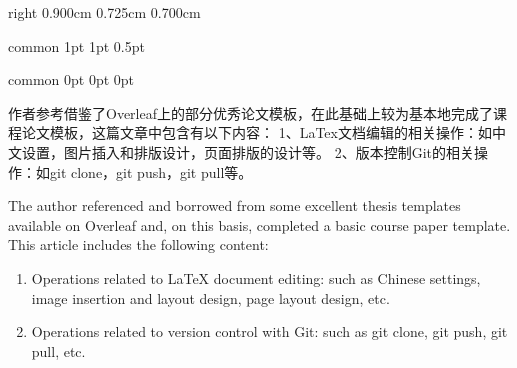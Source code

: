 \documentclass[
    report,     %
    oneside,    %
    UTF8,       %
    zihao=-4    %
]{config} %
\begin{document}
\CoverPage
    {right} %
    {0.900cm} %
    {0.725cm} %
    {0.700cm} %


\Header
    {common} %
    {1pt} %
    {1pt} %
    {0.5pt} %
    {} %
    {} %


\Footer
    {common} %
    {0pt} %
    {0pt} %
    {0pt} %
    {} %
    {\thepage} %
    {} %


\SetRomanPageNumber{} %


\begin{abstractCN}[0.6cm] %

作者参考借鉴了Overleaf上的部分优秀论文模板，在此基础上较为基本地完成了课程论文模板，这篇文章中包含有以下内容：
1、LaTex文档编辑的相关操作：如中文设置，图片插入和排版设计，页面排版的设计等。
2、版本控制Git的相关操作：如git clone，git push，git pull等。

\def\keywordsCN{LaTex文档编辑；版本控制Git}

\end{abstractCN}


\begin{abstractEN}[0.6cm] %

The author referenced and borrowed from some excellent thesis templates available on Overleaf and, on this basis, completed a basic course paper template. This article includes the following content:

\begin{enumerate}
    \item Operations related to LaTeX document editing: such as Chinese settings, image insertion and layout design, page layout design, etc.
    \item Operations related to version control with Git: such as git clone, git push, git pull, etc.
\end{enumerate}



\def\keywordsEN{LaTeX Document Editing; Version Control with Git}

\end{abstractEN}
\end{document}
